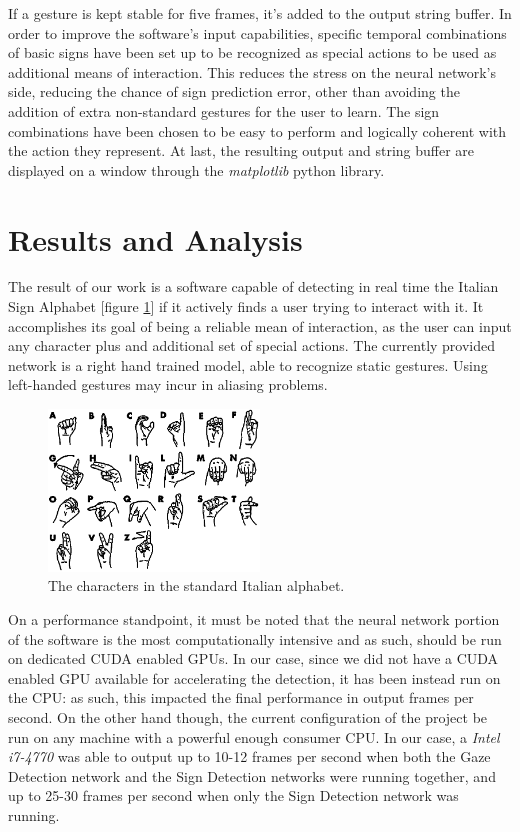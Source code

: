 \documentclass[a4paper, 12pt]{article}
\begin{document}
If a gesture is kept stable for five frames, it's added to the output string buffer. In order to improve the software's input capabilities, specific temporal combinations of basic signs have been set up to be recognized as special actions to be used as additional means of interaction. This reduces the stress on the neural network's side, reducing the chance of sign prediction error, other than avoiding the addition of extra non-standard gestures for the user to learn. The sign combinations have been chosen to be easy to perform and logically coherent with the action they represent.\linebreak
At last, the resulting output and string buffer are displayed on a window through the \textit{matplotlib} python library.

\section{Results and Analysis}
\label{ResutsAndAnalysis}
The result of our work is a software capable of detecting in real time the Italian Sign Alphabet [figure \ref{fig:sign}] if it actively finds a user trying to interact with it. It accomplishes its goal of being a reliable mean of interaction, as the user can input any character plus and additional set of special actions.\linebreak
The currently provided network is a right hand trained model, able to recognize static gestures. Using left-handed gestures may incur in aliasing problems.
\begin{figure}[!h]
    \centering
    \includegraphics[width=0.5\textwidth]{resources/image/sign.png} \caption{The characters in the standard Italian alphabet.} \label{fig:sign}
\end{figure}

On a performance standpoint, it must be noted that the neural network portion of the software is the most computationally intensive and as such, should be run on dedicated CUDA enabled GPUs.\linebreak
In our case, since we did not have a CUDA enabled GPU available for accelerating the detection, it has been instead run on the CPU: as such, this impacted the final performance in output frames per second. On the other hand though, the current configuration of the project be run on any machine with a powerful enough consumer CPU.\linebreak
In our case, a \textit{Intel i7-4770} was able to output up to 10-12 frames per second when both the Gaze Detection network and the Sign Detection networks were running together, and up to 25-30 frames per second when only the Sign Detection network was running.\linebreak
\end{document}

